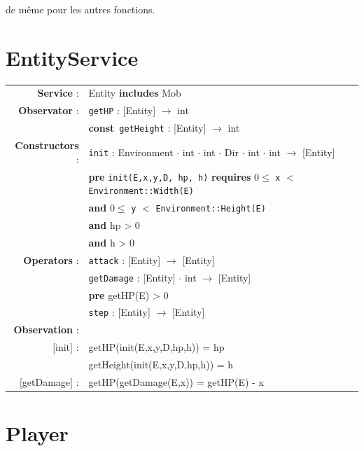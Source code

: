 \documentclass[12pt]{report}
\begin{document}
de même pour les autres fonctions.

\section{EntityService}

\begin{tabular}{rl}

\textbf{Service} : & Entity \textbf{includes} Mob \\

\textbf{Observator} : & \texttt{getHP} : \textrm{[Entity]} $\rightarrow$ \textrm{int} \\
& \textbf{const}~\texttt{getHeight} : \textrm{[Entity]} $\rightarrow$ \textrm{int} \\

\textbf{Constructors} : & \texttt{init} : \textrm{Environment} $\cdot$ \textrm{int} $\cdot$ \textrm{int} $\cdot$ \textrm{Dir} $\cdot$ \textrm{int} $\cdot$ \textrm{int} $\rightarrow$ \textrm{[Entity]} \\
& \textbf{pre} \texttt{init(E,x,y,D, hp, h)} \textbf{requires} $0 \leq$ \texttt{x} $<$ \texttt{Environment::Width(E)} \\
& \quad\quad\quad\quad \textbf{and} $0 \leq$ \texttt{y} $<$ \texttt{Environment::Height(E)} \\
& \quad\quad\quad\quad \textbf{and} hp > 0 \\
& \quad\quad\quad\quad \textbf{and} h > 0 \\

\textbf{Operators} : & \texttt{attack} : \textrm{[Entity]} $\rightarrow$ \textrm{[Entity]} \\
& \texttt{getDamage} : \textrm{[Entity]} $\cdot$ \textrm{int} $\rightarrow$ \textrm{[Entity]} \\
& \quad\quad \textbf{pre} getHP(E) > 0 \\
& \texttt{step} : \textrm{[Entity]} $\rightarrow$ \textrm{[Entity]} \\

\textbf{Observation} : \\
$[$init$]$ : & getHP(init(E,x,y,D,hp,h)) = hp \\
& getHeight(init(E,x,y,D,hp,h)) = h \\
$[$getDamage$]$ : & getHP(getDamage(E,x)) = getHP(E) - x \\

\end{tabular}

\section{Player}
\end{document}
